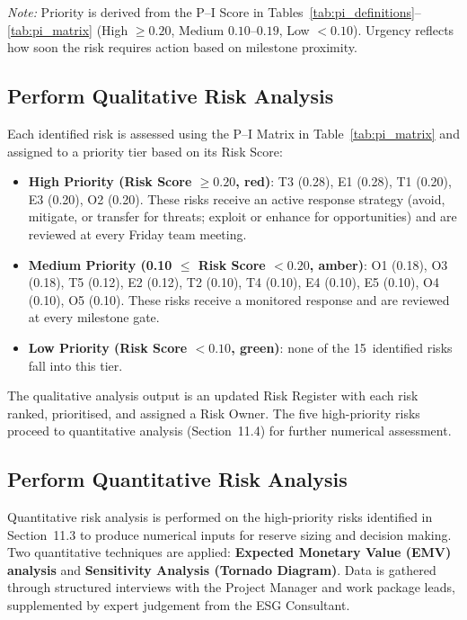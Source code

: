 \documentclass[12pt,a4paper]{article}
\begin{document}
\noindent\textit{Note:} Priority is derived from the P--I Score in Tables~\ref{tab:pi_definitions}--\ref{tab:pi_matrix} (High $\geq 0.20$, Medium $0.10$--$0.19$, Low $< 0.10$). Urgency reflects how soon the risk requires action based on milestone proximity.

\subsection{Perform Qualitative Risk Analysis}

Each identified risk is assessed using the P--I Matrix in Table~\ref{tab:pi_matrix} and assigned to a priority tier based on its Risk Score:

\begin{itemize}[leftmargin=*]
    \item \textbf{High Priority (Risk Score $\geq 0.20$, red)}: T3 (0.28), E1 (0.28), T1 (0.20), E3 (0.20), O2 (0.20). These risks receive an active response strategy (avoid, mitigate, or transfer for threats; exploit or enhance for opportunities) and are reviewed at every Friday team meeting.
    \item \textbf{Medium Priority (0.10 $\leq$ Risk Score $< 0.20$, amber)}: O1 (0.18), O3 (0.18), T5 (0.12), E2 (0.12), T2 (0.10), T4 (0.10), E4 (0.10), E5 (0.10), O4 (0.10), O5 (0.10). These risks receive a monitored response and are reviewed at every milestone gate.
    \item \textbf{Low Priority (Risk Score $< 0.10$, green)}: none of the 15~identified risks fall into this tier.
\end{itemize}

The qualitative analysis output is an updated Risk Register with each risk ranked, prioritised, and assigned a Risk Owner. The five high-priority risks proceed to quantitative analysis (Section~11.4) for further numerical assessment.

\subsection{Perform Quantitative Risk Analysis}

Quantitative risk analysis is performed on the high-priority risks identified in Section~11.3 to produce numerical inputs for reserve sizing and decision making. Two quantitative techniques are applied: \textbf{Expected Monetary Value (EMV) analysis} and \textbf{Sensitivity Analysis (Tornado Diagram)}. Data is gathered through structured interviews with the Project Manager and work package leads, supplemented by expert judgement from the ESG Consultant.
\end{document}
